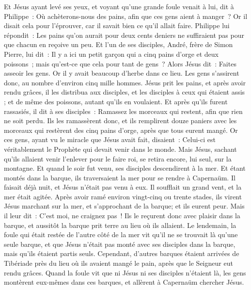 \begin{multicols}{2}
Et Jésus ayant levé ses yeux, et voyant qu'une grande foule venait à lui, dit à Philippe~: Où achèterons-nous des pains, afin que ces gens aient à manger~?
Or il disait cela pour l'éprouver, car il savait bien ce qu'il allait faire.
Philippe lui répondit~: Les pains qu'on aurait pour deux cents deniers ne suffiraient pas pour que chacun en reçoive un peu.
Et l'un de ses disciples, André, frère de Simon Pierre, lui dit~:
Il y a ici un petit garçon qui a cinq pains d'orge et deux poissons~; mais qu'est-ce que cela pour tant de gens~?
Alors Jésus dit~: Faites asseoir les gens. Or il y avait beaucoup d'herbe dans ce lieu. Les gens s'assirent donc, au nombre d'environ cinq mille hommes.
Jésus prit les pains, et après avoir rendu grâces, il les distribua aux disciples, et les disciples à ceux qui étaient assis ; et de même des poissons, autant qu'ils en voulaient.
Et après qu'ils furent rassasiés, il dit à ses disciples~: Ramassez les morceaux qui restent, afin que rien ne soit perdu.
Ils les ramassèrent donc, et ils remplirent douze paniers avec les morceaux qui restèrent des cinq pains d'orge, après que tous eurent mangé.
Or ces gens, ayant vu le miracle que Jésus avait fait, disaient~: Celui-ci est véritablement le Prophète qui devait venir dans le monde.
Mais Jésus, sachant qu'ils allaient venir l'enlever pour le faire roi, se retira encore, lui seul, sur la montagne.
Et quand le soir fut venu, ses disciples descendirent à la mer.
Et étant montés dans la barque, ils traversaient la mer pour se rendre à Capernaüm. Il faisait déjà nuit, et Jésus n'était pas venu à eux.
Il soufflait un grand vent, et la mer était agitée.
Après avoir ramé environ vingt-cinq ou trente stades, ils virent Jésus marchant sur la mer, et s'approchant de la barque; et ils eurent peur.
Mais il leur dit~: C'est moi, ne craignez pas~!
Ils le reçurent donc avec plaisir dans la barque, et aussitôt la barque prit terre au lieu où ils allaient.
Le lendemain, la foule qui était restée de l'autre côté de la mer vit qu'il ne se trouvait là qu'une seule barque, et que Jésus n'était pas monté avec ses disciples dans la barque, mais qu'ils étaient partis seuls.
Cependant, d'autres barques étaient arrivées de Tibériade près du lieu où ils avaient mangé le pain, après que le Seigneur eut rendu grâces.
Quand la foule vit que ni Jésus ni ses disciples n'étaient là, les gens montèrent eux-mêmes dans ces barques, et allèrent à Capernaüm chercher Jésus.

\end{multicols}
